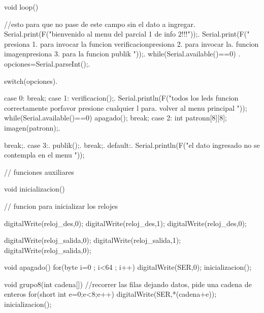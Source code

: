 \documentclass{article}
\begin{document}
void loop()
{
    //esto para que no pase de este campo sin el dato a ingregar.
	Serial.print(F("bienvenido al menu del parcial 1 de info 2!!!\n"));.
    Serial.print(F(" presiona 1. para invocar la funcion verificacion\n presiona 2. para invocar la. funcion imagen\n presiona 3. para la funcion  publik \n \n \n"));.
  	while(Serial.available()==0){} .
  	opciones=Serial.parseInt();.
  	
     switch(opciones).
     {
      case 0:
        break;
      case 1:       
       verificacion();.
       Serial.println(F("todos los leds funcion correctamente \n porfavor presione cualquier l para. volver al menu principal \n \n \n"));
       while(Serial.available()==0){}
       apagado();
       break;
  	  case 2:
       int patronn[8][8];
       imagen(patronn);.
       
       break;.
      case 3:.
        publik();.
      break;.
      default:.
      Serial.println(F("el dato ingresado no se contempla en el menu \n \n \n"));
    }
    
}

// funciones auxiliares 

void inicializacion()
{

// funcion para inicializar los relojes


	digitalWrite(reloj_des,0);
  	digitalWrite(reloj_des,1);
  	digitalWrite(reloj_des,0);
  	
  	digitalWrite(reloj_salida,0);
    digitalWrite(reloj_salida,1);
   	digitalWrite(reloj_salida,0);
}


void apagado()
{	for(byte i=0 ; i<64 ; i++)
	{
  		digitalWrite(SER,0);
    	inicializacion();
	}	
}

void grupo8(int cadena[])
{	//recorrer las filas dejando datos, pide una cadena de enteros 
	for(short int e=0;e<8;e++)
    { 
    	digitalWrite(SER,*(cadena+e));
      	inicializacion();
    }
}  
\end{document}
